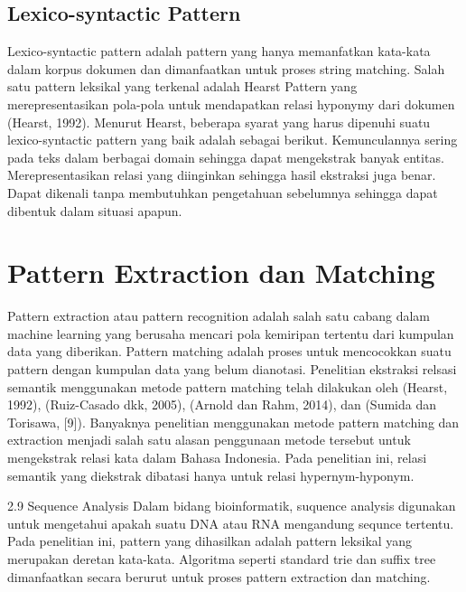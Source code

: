 \subsection{Lexico-syntactic Pattern}
Lexico-syntactic pattern adalah pattern yang hanya memanfatkan kata-kata dalam korpus dokumen dan dimanfaatkan untuk proses string matching. Salah satu pattern leksikal yang terkenal adalah Hearst Pattern yang merepresentasikan pola-pola untuk mendapatkan relasi hyponymy dari dokumen (Hearst, 1992). Menurut Hearst, beberapa syarat yang harus dipenuhi suatu lexico-syntactic pattern yang baik adalah sebagai berikut.
Kemunculannya sering pada teks dalam berbagai domain sehingga dapat mengekstrak banyak entitas.
Merepresentasikan relasi yang diinginkan sehingga hasil ekstraksi juga benar.
Dapat dikenali tanpa membutuhkan pengetahuan sebelumnya sehingga dapat dibentuk dalam situasi apapun.


\section{Pattern Extraction dan Matching}
Pattern extraction atau pattern recognition adalah salah satu cabang dalam machine learning yang berusaha mencari pola kemiripan tertentu dari kumpulan data yang diberikan. Pattern matching adalah proses untuk mencocokkan suatu pattern dengan kumpulan data yang belum dianotasi. Penelitian ekstraksi relsasi semantik menggunakan metode pattern matching telah dilakukan oleh (Hearst, 1992), (Ruiz-Casado dkk, 2005), (Arnold dan Rahm, 2014), dan (Sumida dan Torisawa, [9]).
Banyaknya penelitian menggunakan metode pattern matching dan extraction menjadi salah satu alasan penggunaan metode tersebut untuk mengekstrak relasi kata dalam Bahasa Indonesia. Pada penelitian ini, relasi semantik yang diekstrak dibatasi hanya untuk relasi hypernym-hyponym. 


2.9 Sequence Analysis
Dalam bidang bioinformatik, suquence analysis digunakan untuk mengetahui apakah suatu DNA atau RNA mengandung sequnce tertentu. Pada penelitian ini, pattern yang dihasilkan adalah pattern leksikal yang merupakan deretan kata-kata. Algoritma seperti standard trie dan suffix tree dimanfaatkan secara berurut untuk proses pattern extraction dan matching.

